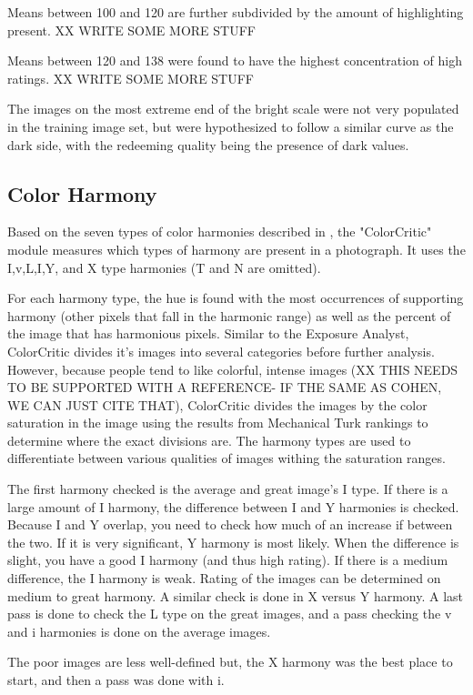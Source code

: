 \documentclass[twocolumn]{article}
\begin{document}
Means between 100 and 120 are further subdivided by the amount of highlighting present. XX WRITE SOME MORE STUFF

Means between 120 and 138 were found to have the highest concentration of high ratings. XX WRITE SOME MORE STUFF

The images on the most extreme end of the bright scale were not very populated in the training image set, but were hypothesized to follow a similar curve as the dark side, with the redeeming quality being the presence of dark values.

\subsection{Color Harmony}   
Based on the seven types of color harmonies described in \cite{Cohen-Or:2006:CH:1179352.1141933}, the "ColorCritic" module measures which types of harmony are present in a photograph. It uses the I,v,L,I,Y, and X type harmonies (T and N are omitted).

For each harmony type, the hue is found with the most occurrences of supporting harmony (other pixels that fall in the harmonic range) as well as the percent of the image that has harmonious pixels. Similar to the Exposure Analyst, ColorCritic divides it's images into several categories before further analysis. However, because people tend to like colorful, intense images (XX THIS NEEDS TO BE SUPPORTED WITH A REFERENCE- IF THE SAME AS COHEN, WE CAN JUST CITE THAT), ColorCritic divides the images by the color saturation in the image using the results from Mechanical Turk rankings to determine where the exact divisions are. The harmony types are used to differentiate between various qualities of images withing the saturation ranges.

The first harmony checked is the average and great image's I type. If there is a large amount of I harmony, the difference between I and Y harmonies is checked. Because I and Y overlap, you need to check how much of an increase if between the two. If it is very significant, Y harmony is most likely. When the difference is slight, you have a good I harmony (and thus high rating). If there is a medium difference, the I harmony is weak. Rating of the images can be determined on medium to great harmony. A similar check is done in X versus Y harmony. A last pass is done to check the L type on the great images, and a pass checking the v and i harmonies is done on the average images.

The poor images are less well-defined but, the X harmony was the best place to start, and then a pass was done with i.
\end{document}
